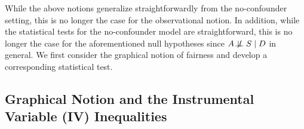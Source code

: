 While the above notions generalize straightforwardly from the no-confounder setting, this is no longer the case for the observational notion. In addition, while the statistical tests for the no-confounder model are straightforward, this is no longer the case for the aforementioned null hypotheses since $A \not\!\perp\!\!\!\perp S \mid D$ in general. We first consider the graphical notion of fairness and develop a corresponding statistical test.

\subsection{Graphical Notion and the Instrumental Variable (IV) Inequalities}\label{subsec:graph_iv}


